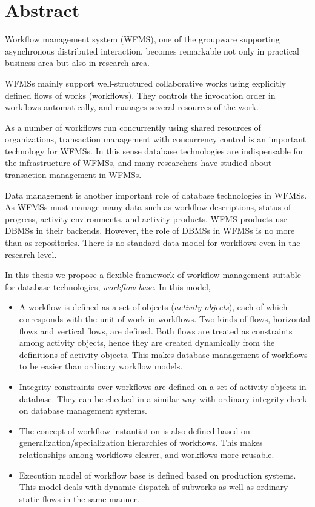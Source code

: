 
\chapter*{Abstract}

Workflow management system (WFMS), one of the groupware supporting
asynchronous distributed interaction, becomes remarkable not only in
practical business area but also in research area.  

WFMSs mainly support well-structured collaborative works using
explicitly defined flows of works (workflows).  They controls the
invocation order in workflows automatically, and manages several
resources of the work.

As a number of workflows run concurrently using shared resources of
organizations, transaction management with concurrency control is an
important technology for WFMSs.  In this sense database technologies are
indispensable for the infrastructure of WFMSs, and many researchers have
studied about transaction management in WFMSs.

Data management is another important role of database technologies in
WFMSs.  As WFMSs must manage many data such as workflow descriptions,
status of progress, activity environments, and activity products, WFMS
products use DBMSs in their backends.  However, the role of DBMSs in WFMSs
is no more than as repositories.  There is no standard data model for
workflows even in the research level.

In this thesis we propose a flexible framework of workflow management
suitable for database technologies, {\em workflow base}.  In this model,
\begin{itemize}
 \item A workflow is defined as a set of objects (\emph{activity
       objects}), each of which corresponds with the unit of work in
       workflows.  Two kinds of flows, horizontal flows and vertical
       flows, are defined.  Both flows are treated as constraints among
       activity objects, hence they are created dynamically from the
       definitions of activity objects.  This makes database management
       of workflows to be easier than ordinary workflow models.
 \item Integrity constraints over workflows are defined on a set of
       activity objects in database.  They can be checked in a similar
       way with ordinary integrity check on database management
       systems.
 \item The concept of workflow instantiation is also defined based on
       generalization/specialization hierarchies of workflows.  This makes 
       relationships among workflows clearer, and workflows more
       reusable.
 \item Execution model of workflow base is defined based on production
       systems.  This model deals with dynamic dispatch of subworks as
       well as ordinary static flows in the same manner.
\end{itemize}

